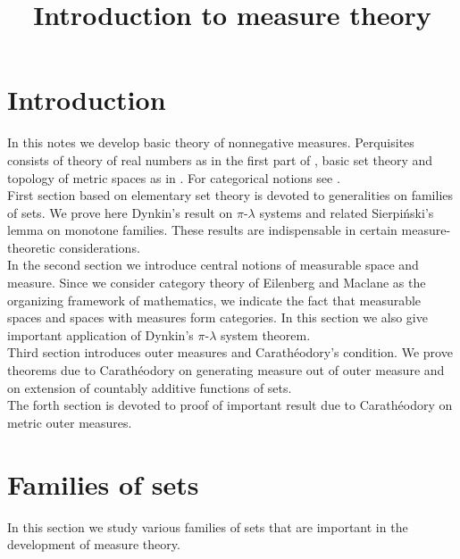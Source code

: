 



\title{Introduction to measure theory}
\date{}
\maketitle

\section{Introduction}
\noindent
In this notes we develop basic theory of nonnegative measures. Perquisites consists of theory of real numbers as in the first part of \cite{FichtenholzI}, basic set theory and topology of metric spaces as in \cite{Kuratowski}. For categorical notions see \cite{Maclane}.\\
\noindent
First section based on elementary set theory is devoted to generalities on families of sets. We prove here Dynkin's result on $\pi$-$\lambda$ systems and related Sierpiński's lemma on monotone families. These results are indispensable in certain measure-theoretic considerations.\\
In the second section we introduce central notions of measurable space and measure. Since we consider category theory of Eilenberg and Maclane as the organizing framework of mathematics, we indicate the fact that measurable spaces and spaces with measures form categories. In this section we also give important application of Dynkin's $\pi$-$\lambda$ system theorem.\\
Third section introduces outer measures and Carath{\'e}odory's condition. We prove theorems due to Carath{\'e}odory on generating measure out of outer measure and on extension of countably additive functions of sets.\\
The forth section is devoted to proof of important result due to Carath{\'e}odory on metric outer measures.

\section{Families of sets}
\noindent
In this section we study various families of sets that are important in the development of measure theory.

